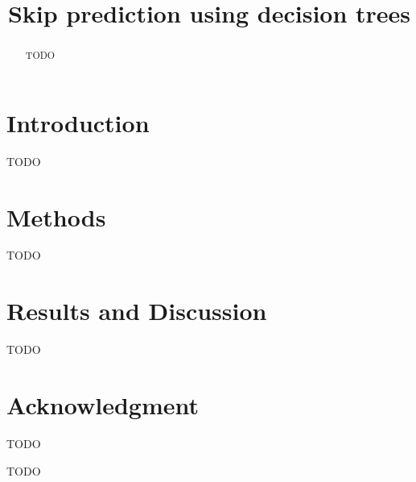 \documentclass[conference]{IEEEtran}
\begin{document}
\title{Skip prediction using decision trees\\}

\author{
}

\maketitle

\begin{abstract}
	TODO
\end{abstract}


\section{Introduction}
TODO

\section{Methods}
TODO


\section{Results and Discussion}
TODO


\section*{Acknowledgment}
TODO



\begin{thebibliography}{00}
 TODO
\end{thebibliography}
\end{document}
